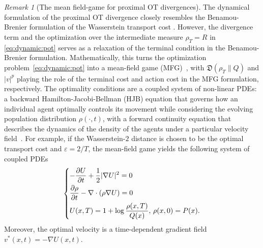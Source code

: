 \documentclass{amsart}
\newcommand{\bjz}[1]{#1} %
\theoremstyle{definition}
\theoremstyle{remark}
\newtheorem{remark}[theorem]{Remark}
\numberwithin{equation}{section}
\begin{document}
\begin{remark}[The mean field-game for proximal OT divergences]
 The dynamical formulation of the proximal OT divergence closely resembles the Benamou-Brenier formulation of the Wasserstein transport cost \cite{Benamou2000}. However, the divergence term and the optimization over the intermediate measure $\rho_T=R$ in \eqref{eq:dynamic:pot} serves as a relaxation of the terminal condition in the Benamou-Brenier formulation. Mathematically, this turns the optimization problem~\eqref{eq:dynamic:pot} into a mean-field game (MFG)~\cite{lasry2007mean}, with $\mathfrak{D} (\rho_T\|Q)$ and $|v|^p$ playing the role of the terminal cost and action cost in the MFG formulation, respectively. The optimality conditions are a coupled system of non-linear PDEs: a backward Hamilton-Jacobi-Bellman (HJB) equation that governs how an individual agent optimally controls its movement while considering the evolving population distribution $\rho(\cdot,t)$, with a forward continuity equation that describes the dynamics of the density of the agents under a particular velocity field~\cite{zhang2023mean}. For example, if the Wasserstein-$2$ distance is chosen to be the optimal transport cost \bjz{and $\varepsilon = 2/T$}, the mean-field game yields the following system of coupled PDEs
\begin{align}
    \begin{dcases}
        - \frac{\partial U}{\partial t} + \frac{1}{2}|\nabla U|^2 = 0 \\
        \frac{\partial \rho}{\partial t} - \nabla \cdot(\rho\nabla U) = 0 \\
        U(x,T) = 1 + \log \frac{\rho(x,T)}{Q(x)}, \, \rho(x,0) = P(x).
    \end{dcases}
\end{align}
Moreover, the optimal velocity is a time-dependent gradient field $v^*(x,t) = -\nabla U(x,t)$. 

\end{remark}
\end{document}
